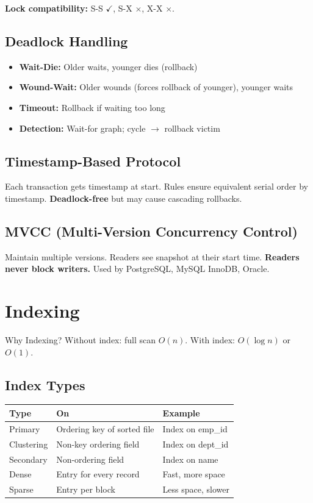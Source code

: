 \documentclass[12pt,a4paper]{article}
\begin{document}
\textbf{Lock compatibility:} S-S $\checkmark$, S-X $\times$, X-X $\times$.

\subsection{Deadlock Handling}
\begin{itemize}[leftmargin=*]
    \item \textbf{Wait-Die:} Older waits, younger dies (rollback)
    \item \textbf{Wound-Wait:} Older wounds (forces rollback of younger), younger waits
    \item \textbf{Timeout:} Rollback if waiting too long
    \item \textbf{Detection:} Wait-for graph; cycle $\to$ rollback victim
\end{itemize}

\subsection{Timestamp-Based Protocol}
Each transaction gets timestamp at start. Rules ensure equivalent serial order by timestamp. \textbf{Deadlock-free} but may cause cascading rollbacks.

\subsection{MVCC (Multi-Version Concurrency Control)}
Maintain multiple versions. Readers see snapshot at their start time. \textbf{Readers never block writers.} Used by PostgreSQL, MySQL InnoDB, Oracle.

\section{Indexing}

\begin{conceptbox}{Why Indexing?}
Without index: full scan $O(n)$. With index: $O(\log n)$ or $O(1)$.
\end{conceptbox}

\subsection{Index Types}
\begin{center}
\begin{tabular}{@{}l l l@{}}
\toprule
\textbf{Type} & \textbf{On} & \textbf{Example} \\
\midrule
Primary & Ordering key of sorted file & Index on emp\_id \\
Clustering & Non-key ordering field & Index on dept\_id \\
Secondary & Non-ordering field & Index on name \\
Dense & Entry for every record & Fast, more space \\
Sparse & Entry per block & Less space, slower \\
\bottomrule
\end{tabular}
\end{center}
\end{document}
